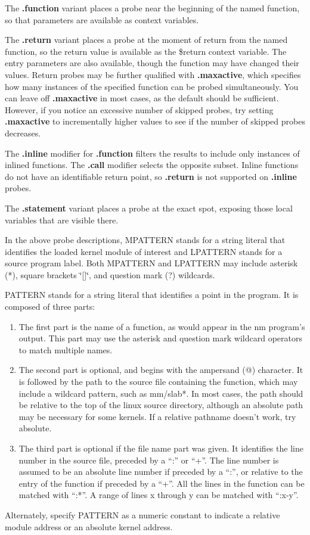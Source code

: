 \documentclass[twoside,english]{article}
\begin{document}
The \textbf{.function} variant places a probe near the beginning of the named
function, so that parameters are available as context variables. 

The \textbf{.return} variant places a probe at the moment of return from the named
function, so the return value is available as the \$return context variable.
The entry parameters are also available, though the function may have changed
their values.  Return probes may be further qualified with \textbf{.maxactive}, 
which specifies how many instances of the specified function can be probed simultaneously.
You can leave off \textbf{.maxactive} in most cases, as the default should be sufficient.
However, if you notice an excessive number of skipped probes, try setting \textbf{.maxactive}
to incrementally higher values to see if the number of skipped probes decreases.

The \textbf{.inline} modifier for \textbf{.function} filters the results to include only 
instances of inlined functions. The \textbf{.call} modifier selects the opposite subset.
Inline functions do not have an identifiable return point, so \textbf{.return}
is not supported on \textbf{.inline} probes.

The \textbf{.statement} variant places a probe at the exact spot, exposing those local
variables that are visible there.

In the above probe descriptions, MPATTERN stands for a string literal
that identifies the loaded kernel module of interest and LPATTERN
stands for a source program label. Both MPATTERN and LPATTERN may
include asterisk ({*}), square brackets \char`\"{}{[}]\char`\"{}, and
question mark (?) wildcards.

PATTERN stands for a string literal that identifies a point in the program.
It is composed of three parts:

\begin{enumerate}
\item The first part is the name of a function, as would appear in the nm program's
output. This part may use the asterisk and question mark wildcard operators
to match multiple names.
\item The second part is optional, and begins with the ampersand (@) character.
It is followed by the path to the source file containing the function,
which may include a wildcard pattern, such as mm/slab{*}.
In most cases, the path should be relative to the top of the
linux source directory, although an absolute path may be necessary for some kernels.
If a relative pathname doesn't work, try absolute.
\item The third part is optional if the file name part was given. It identifies
the line number in the source file, preceded by a ``:'' or ``+''.   
The line number is assumed to be an
absolute line number if preceded by a ``:'', or relative to the entry of
the function if preceded by a ``+''.
All the lines in the function can be matched with ``:*''.
A range of lines x through y can be matched with ``:x-y''.

\end{enumerate}
Alternately, specify PATTERN as a numeric constant to indicate a relative
module address or an absolute kernel address.
\end{document}
